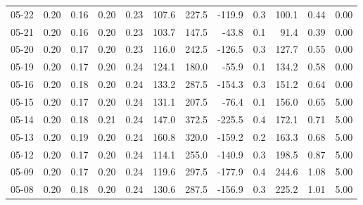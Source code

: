 \begin{threeparttable}
{\begin{tabular}{lrrrrrrrrrrr}
  05-22 &          0.20 &          0.16 &          0.20 &        0.23 &               107.6 &               227.5 &     -119.9 &                 0.3 &            100.1 &            0.44 &                   0.00 \\
  05-21 &          0.20 &          0.16 &          0.20 &        0.23 &               103.7 &               147.5 &      -43.8 &                 0.1 &             91.4 &            0.39 &                   0.00 \\
  05-20 &          0.20 &          0.17 &          0.20 &        0.23 &               116.0 &               242.5 &     -126.5 &                 0.3 &            127.7 &            0.55 &                   0.00 \\
  05-19 &          0.20 &          0.17 &          0.20 &        0.24 &               124.1 &               180.0 &      -55.9 &                 0.1 &            134.2 &            0.58 &                   0.00 \\
  05-16 &          0.20 &          0.18 &          0.20 &        0.24 &               133.2 &               287.5 &     -154.3 &                 0.3 &            151.2 &            0.64 &                   0.00 \\
  05-15 &          0.20 &          0.17 &          0.20 &        0.24 &               131.1 &               207.5 &      -76.4 &                 0.1 &            156.0 &            0.65 &                   5.00 \\
  05-14 &          0.20 &          0.18 &          0.21 &        0.24 &               147.0 &               372.5 &     -225.5 &                 0.4 &            172.1 &            0.71 &                   5.00 \\
  05-13 &          0.20 &          0.19 &          0.20 &        0.24 &               160.8 &               320.0 &     -159.2 &                 0.2 &            163.3 &            0.68 &                   5.00 \\
  05-12 &          0.20 &          0.17 &          0.20 &        0.24 &               114.1 &               255.0 &     -140.9 &                 0.3 &            198.5 &            0.87 &                   5.00 \\
  05-09 &          0.20 &          0.17 &          0.20 &        0.24 &               119.6 &               297.5 &     -177.9 &                 0.4 &            244.6 &            1.08 &                   5.00 \\
  05-08 &          0.20 &          0.18 &          0.20 &        0.24 &               130.6 &               287.5 &     -156.9 &                 0.3 &            225.2 &            1.01 &                   5.00 \\

\end{tabular}}
\end{threeparttable}
